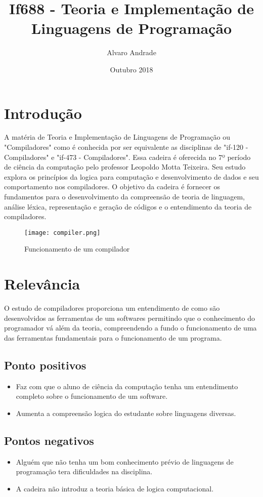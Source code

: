 \documentclass[10pt]{article}
\title{If688 - Teoria e Implementação de Linguagens de Programação}
\author{Alvaro Andrade }
\date{Outubro 2018}
\begin{document}
\maketitle

\section{Introdução}
A matéria de Teoria e  Implementação de Linguagens de Programação ou "Compiladores" como é conhecida por ser equivalente as disciplinas de "if-120 - Compiladores" e "if-473 - Compiladores". Essa cadeira é oferecida no 7º período de ciência da computação pelo professor Leopoldo Motta Teixeira. Seu estudo explora os princípios da logica para computação e desenvolvimento de dados e seu comportamento nos compiladores. O objetivo da cadeira é fornecer os fundamentos para o desenvolvimento da compreensão de teoria de linguagem, análise léxica, representação e geração de códigos e o entendimento da teoria de compiladores. 
 
\begin{figure}[h!]
\centering
\texttt{[image: compiler.png]}
\caption{Funcionamento de um compilador}
\end{figure}

\section{Relevância}
O estudo de compiladores proporciona um entendimento de como são desenvolvidos as ferramentas de um softwares permitindo que o conhecimento do programador vá além da teoria, compreendendo a fundo o funcionamento de uma das ferramentas fundamentais para o funcionamento de um programa.

\subsection{Ponto positivos}
\begin{itemize}
\item Faz com que o aluno de ciência da computação tenha um entendimento completo sobre o funcionamento de um software.
\item Aumenta a compreensão logica do estudante sobre linguagens diversas. 
\end{itemize}

\subsection{Pontos negativos}
\begin{itemize}
\item Alguém que não tenha um bom conhecimento prévio de linguagens de programação tera dificuldades na disciplina. 
\item A cadeira não introduz a teoria básica de logica computacional.
\end{itemize}
\end{document}
